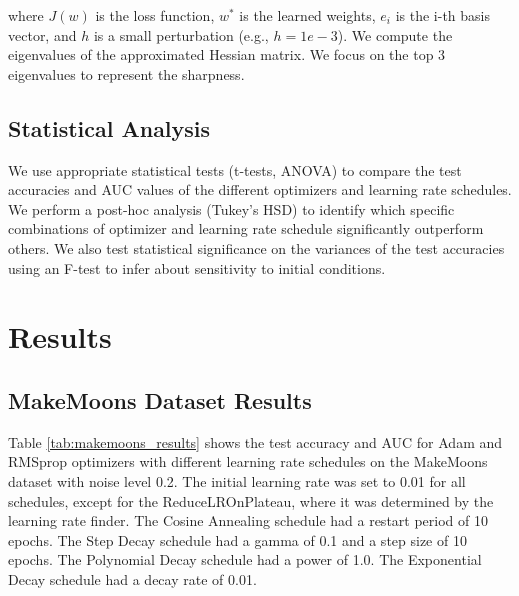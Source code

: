 \documentclass[conference]{IEEEtran}
\begin{document}
where $J(w)$ is the loss function, $w^*$ is the learned weights, $e_i$ is the i-th basis vector, and $h$ is a small perturbation (e.g., $h = 1e-3$). We compute the eigenvalues of the approximated Hessian matrix.  We focus on the top 3 eigenvalues to represent the sharpness.

\subsection{Statistical Analysis}
We use appropriate statistical tests (t-tests, ANOVA) to compare the test accuracies and AUC values of the different optimizers and learning rate schedules. We perform a post-hoc analysis (Tukey's HSD) to identify which specific combinations of optimizer and learning rate schedule significantly outperform others. We also test statistical significance on the variances of the test accuracies using an F-test to infer about sensitivity to initial conditions.

\section{Results}

\subsection{MakeMoons Dataset Results}

Table \ref{tab:makemoons_results} shows the test accuracy and AUC for Adam and RMSprop optimizers with different learning rate schedules on the MakeMoons dataset with noise level 0.2.  The initial learning rate was set to 0.01 for all schedules, except for the ReduceLROnPlateau, where it was determined by the learning rate finder.  The Cosine Annealing schedule had a restart period of 10 epochs.  The Step Decay schedule had a gamma of 0.1 and a step size of 10 epochs.  The Polynomial Decay schedule had a power of 1.0.  The Exponential Decay schedule had a decay rate of 0.01.
\end{document}

